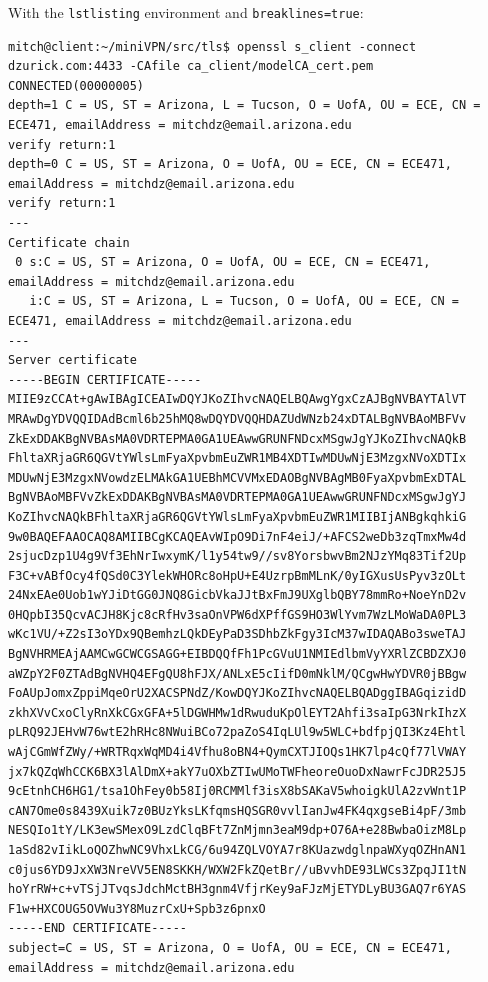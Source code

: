 \documentclass[12pt]{article}
\begin{document}
With the \texttt{lstlisting} environment and \texttt{breaklines=true}:
\begin{lstlisting}
mitch@client:~/miniVPN/src/tls$ openssl s_client -connect dzurick.com:4433 -CAfile ca_client/modelCA_cert.pem 
CONNECTED(00000005)
depth=1 C = US, ST = Arizona, L = Tucson, O = UofA, OU = ECE, CN = ECE471, emailAddress = mitchdz@email.arizona.edu
verify return:1
depth=0 C = US, ST = Arizona, O = UofA, OU = ECE, CN = ECE471, emailAddress = mitchdz@email.arizona.edu
verify return:1
---
Certificate chain
 0 s:C = US, ST = Arizona, O = UofA, OU = ECE, CN = ECE471, emailAddress = mitchdz@email.arizona.edu
   i:C = US, ST = Arizona, L = Tucson, O = UofA, OU = ECE, CN = ECE471, emailAddress = mitchdz@email.arizona.edu
---
Server certificate
-----BEGIN CERTIFICATE-----
MIIE9zCCAt+gAwIBAgICEAIwDQYJKoZIhvcNAQELBQAwgYgxCzAJBgNVBAYTAlVT
MRAwDgYDVQQIDAdBcml6b25hMQ8wDQYDVQQHDAZUdWNzb24xDTALBgNVBAoMBFVv
ZkExDDAKBgNVBAsMA0VDRTEPMA0GA1UEAwwGRUNFNDcxMSgwJgYJKoZIhvcNAQkB
FhltaXRjaGR6QGVtYWlsLmFyaXpvbmEuZWR1MB4XDTIwMDUwNjE3MzgxNVoXDTIx
MDUwNjE3MzgxNVowdzELMAkGA1UEBhMCVVMxEDAOBgNVBAgMB0FyaXpvbmExDTAL
BgNVBAoMBFVvZkExDDAKBgNVBAsMA0VDRTEPMA0GA1UEAwwGRUNFNDcxMSgwJgYJ
KoZIhvcNAQkBFhltaXRjaGR6QGVtYWlsLmFyaXpvbmEuZWR1MIIBIjANBgkqhkiG
9w0BAQEFAAOCAQ8AMIIBCgKCAQEAvWIpO9Di7nF4eiJ/+AFCS2weDb3zqTmxMw4d
2sjucDzp1U4g9Vf3EhNrIwxymK/l1y54tw9//sv8YorsbwvBm2NJzYMq83Tif2Up
F3C+vABfOcy4fQSd0C3YlekWHORc8oHpU+E4UzrpBmMLnK/0yIGXusUsPyv3zOLt
24NxEAe0Uob1wYJiDtGG0JNQ8GicbVkaJJtBxFmJ9UXglbQBY78mmRo+NoeYnD2v
0HQpbI35QcvACJH8Kjc8cRfHv3saOnVPW6dXPffGS9HO3WlYvm7WzLMoWaDA0PL3
wKc1VU/+Z2sI3oYDx9QBemhzLQkDEyPaD3SDhbZkFgy3IcM37wIDAQABo3sweTAJ
BgNVHRMEAjAAMCwGCWCGSAGG+EIBDQQfFh1PcGVuU1NMIEdlbmVyYXRlZCBDZXJ0
aWZpY2F0ZTAdBgNVHQ4EFgQU8hFJX/ANLxE5cIifD0mNklM/QCgwHwYDVR0jBBgw
FoAUpJomxZppiMqeOrU2XACSPNdZ/KowDQYJKoZIhvcNAQELBQADggIBAGqizidD
zkhXVvCxoClyRnXkCGxGFA+5lDGWHMw1dRwuduKpOlEYT2Ahfi3saIpG3NrkIhzX
pLRQ92JEHvW76wtE2hRHc8NWuiBCo72paZoS4IqLUl9w5WLC+bdfpjQI3Kz4Ehtl
wAjCGmWfZWy/+WRTRqxWqMD4i4Vfhu8oBN4+QymCXTJIOQs1HK7lp4cQf77lVWAY
jx7kQZqWhCCK6BX3lAlDmX+akY7uOXbZTIwUMoTWFheoreOuoDxNawrFcJDR25J5
9cEtnhCH6HG1/tsa1OhFey0b58Ij0RCMMlf3isX8bSAKaV5whoigkUlA2zvWnt1P
cAN7Ome0s8439Xuik7z0BUzYksLKfqmsHQSGR0vvlIanJw4FK4qxgseBi4pF/3mb
NESQIo1tY/LK3ewSMexO9LzdClqBFt7ZnMjmn3eaM9dp+O76A+e28BwbaOizM8Lp
1aSd82vIikLoQOZhwNC9VhxLkCG/6u94ZQLVOYA7r8KUazwdglnpaWXyqOZHnAN1
c0jus6YD9JxXW3NreVV5EN8SKKH/WXW2FkZQetBr//uBvvhDE93LWCs3ZpqJI1tN
hoYrRW+c+vTSjJTvqsJdchMctBH3gnm4VfjrKey9aFJzMjETYDLyBU3GAQ7r6YAS
F1w+HXCOUG5OVWu3Y8MuzrCxU+Spb3z6pnxO
-----END CERTIFICATE-----
subject=C = US, ST = Arizona, O = UofA, OU = ECE, CN = ECE471, emailAddress = mitchdz@email.arizona.edu


\end{lstlisting}
\end{document}
